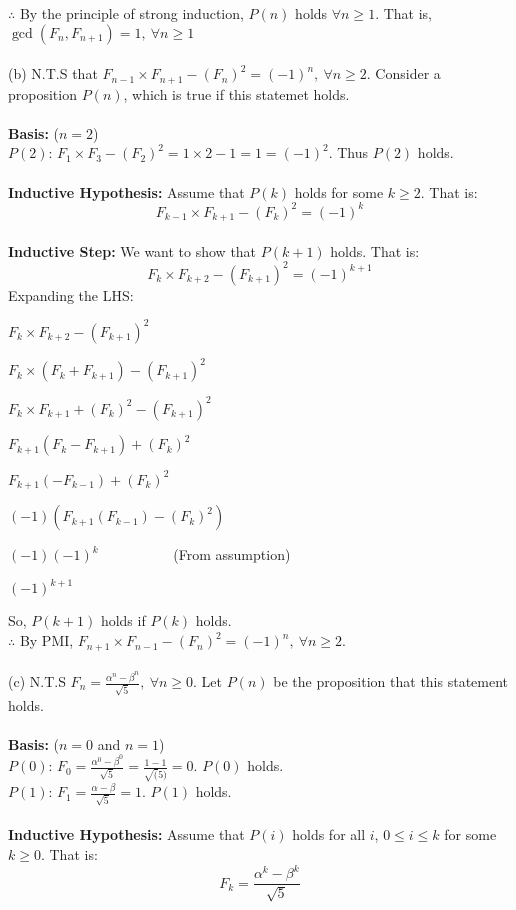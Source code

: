 \documentclass[a4paper]{article}
\begin{document}
\begin{enumerate}
$\therefore$ By the principle of strong induction, $P(n)$ holds $\forall n \geq 1$. That is, $\gcd(F_n, F_{n+1}) = 1,\ \forall n \geq 1$\\
\\
(b) N.T.S that $F_{n-1} \times F_{n+1} - (F_n)^2 = (-1)^n,\ \forall n \geq 2$. Consider a proposition $P(n)$, which is true if this statemet holds.\\
\\
\textbf{Basis:} ($n=2$)\\
$P(2)$: $F_{1} \times F_{3} - (F_2)^2 = 1 \times 2 - 1 = 1 = (-1)^2$. Thus $P(2)$ holds.\\
\\
\textbf{Inductive Hypothesis:} Assume that $P(k)$ holds for some $k \geq 2$. That is:
$$F_{k-1} \times F_{k+1} - (F_k)^2 = (-1)^k$$
\\
\textbf{Inductive Step:} We want to show that $P(k+1)$ holds. That is:
$$F_{k} \times F_{k+2} - (F_{k+1})^2 = (-1)^{k+1}$$
Expanding the LHS:
\begin{sollist}
    \item $F_{k} \times F_{k+2} - (F_{k+1})^2$
    \item $F_k \times (F_{k} + F_{k+1}) - (F_{k+1})^2$
    \item $F_k \times F_{k+1} + (F_{k})^2 - (F_{k+1})^2$
    \item $F_{k+1} (F_{k} - F_{k+1}) + (F_{k})^2$
    \item $F_{k+1} (-F_{k-1}) + (F_{k})^2$
    \item $(-1)(F_{k+1} (F_{k-1}) - (F_{k})^2)$
    \item $(-1)(-1)^k$ \ \ \ \ \ \ \ \ \ \ (From assumption)
    \item $(-1)^{k+1}$
\end{sollist}

So, $P(k+1)$ holds if $P(k)$ holds.\\
$\therefore$ By PMI, $F_{n+1}\times F_{n-1} - (F_n)^2 = (-1)^n,\ \forall n \geq 2$.\\
\\
(c) N.T.S $F_n = \frac{\alpha^n -\beta^n}{\sqrt{5}},\ \forall n \geq 0$. Let $P(n)$ be the proposition that this statement holds.\\
\\
\textbf{Basis:} ($n=0$ and $n=1$)\\
$P(0)$: $F_0 = \frac{\alpha^0 - \beta^0}{\sqrt{5}} = \frac{1-1}{\sqrt(5)} = 0$. $P(0)$ holds.\\
$P(1)$: $F_1 = \frac{\alpha - \beta}{\sqrt{5}} = 1$. $P(1)$ holds.\\
\\
\textbf{Inductive Hypothesis:} Assume that $P(i)$ holds for all $i$, $0 \leq i \leq k$ for some $k \geq 0$. That is:
$$F_k = \frac{\alpha^k - \beta^k}{\sqrt{5}}$$


\end{enumerate}
\end{document}
